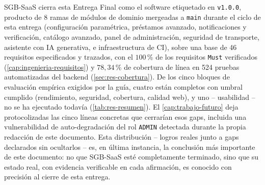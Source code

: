 SGB-SaaS cierra esta Entrega Final como el software etiquetado en \texttt{v1.0.0}, producto de 8 ramas de
módulos de dominio mergeadas a \texttt{main} durante el ciclo de esta
entrega (configuración paramétrica, préstamos avanzado, notificaciones y
verificación, catálogo avanzado, panel de administración, seguridad de
transporte, asistente con IA generativa, e infraestructura de CI), sobre
una base de 46 requisitos especificados y trazados, con el $100$\,\% de
los requisitos \texttt{Must} verificados
(\autoref{cap:ingenieria-requisitos}) y $78{,}34$\,\% de cobertura de
línea en 524 pruebas automatizadas del backend
(\autoref{sec:res-cobertura}). De los cinco bloques de evaluación
empírica exigidos por la guía, cuatro están completos con umbral
cumplido (rendimiento, seguridad, cobertura, calidad web), y uno --
usabilidad -- no se ha ejecutado todavía
(\autoref{tab:res-resumen}). El \autoref{cap:trabajo-futuro} deja
protocolizadas las cinco líneas concretas que cerrarían esos gaps, incluida
una vulnerabilidad de auto-degradación del rol \texttt{ADMIN} detectada
durante la propia redacción de este documento. Esta distribución -- logros
reales junto a gaps declarados sin ocultarlos -- es, en última instancia,
la conclusión más importante de este documento: no que SGB-SaaS esté
completamente terminado, sino que su estado real, con evidencia
verificable en cada afirmación, es conocido con precisión al cierre de
esta entrega.
